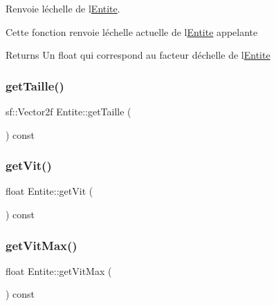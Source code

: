 Renvoie l\textquotesingle{}échelle de l\textquotesingle{}\mbox{\hyperlink{class_entite}{Entite}}. 

Cette fonction renvoie l\textquotesingle{}échelle actuelle de l\textquotesingle{}\mbox{\hyperlink{class_entite}{Entite}} appelante \begin{DoxyReturn}{Returns}
Un {\ttfamily float} qui correspond au facteur d\textquotesingle{}échelle de l\textquotesingle{}\mbox{\hyperlink{class_entite}{Entite}} 
\end{DoxyReturn}
\mbox{\label{class_entite_ac9ce99e4eb26bb9c4b9f2c8aaf3899c8}} 
\subsubsection{\texorpdfstring{get\+Taille()}{getTaille()}}
{\footnotesize\ttfamily sf\+::\+Vector2f Entite\+::get\+Taille (\begin{DoxyParamCaption}{ }\end{DoxyParamCaption}) const\hspace{0.3cm}{\ttfamily [inline]}}

\mbox{\label{class_entite_a36d7c2ce68d2965d08fe28c77a3b4a70}} 
\subsubsection{\texorpdfstring{get\+Vit()}{getVit()}}
{\footnotesize\ttfamily float Entite\+::get\+Vit (\begin{DoxyParamCaption}{ }\end{DoxyParamCaption}) const\hspace{0.3cm}{\ttfamily [inline]}}

\mbox{\label{class_entite_a4b57be1f229ec78b5c1a8ea70bdd1d3d}} 
\subsubsection{\texorpdfstring{get\+Vit\+Max()}{getVitMax()}}
{\footnotesize\ttfamily float Entite\+::get\+Vit\+Max (\begin{DoxyParamCaption}{ }\end{DoxyParamCaption}) const\hspace{0.3cm}{\ttfamily [inline]}}

